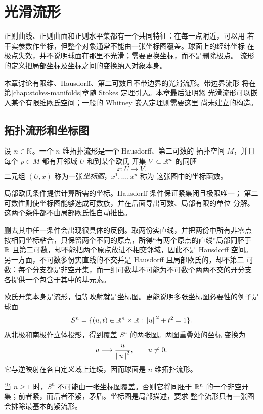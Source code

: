 \chapter{光滑流形}
\label{chap:smooth-manifolds}

正则曲线、正则曲面和正则水平集都有一个共同特征：在每一点附近，可以用
若干实参数作坐标，但整个对象通常不能由一张坐标图覆盖。球面上的经纬坐标
在极点失效，并不说明球面在那里不光滑；需要更换坐标，而不是删除极点。
流形的定义把局部坐标及坐标之间的变换纳入对象本身。

本章讨论有限维、Hausdorff、第二可数且不带边界的光滑流形。带边界流形
将在第\ref{chap:stokes-manifolds}章随 Stokes 定理引入。本章最后证明紧
光滑流形可以嵌入某个有限维欧氏空间；一般的 Whitney 嵌入定理则需要这里
尚未建立的构造。

\section{拓扑流形和坐标图}

\begin{definition}
设 \(n\in\mathbb{N}\)。一个 \(n\) 维拓扑流形是一个 Hausdorff、第二可数的
拓扑空间 \(M\)，并且每个 \(p\in M\) 都有开邻域 \(U\) 和到某个欧氏
开集 \(V\subset\mathbb{R}^n\) 的同胚
\[
 x:U\longrightarrow V.
\]
二元组 \((U,x)\) 称为一张\emph{坐标图}，\(x^1,\ldots,x^n\) 称为
这张图中的坐标函数。
\end{definition}

局部欧氏条件提供计算所需的坐标。Hausdorff 条件保证紧集闭且极限唯一；
第二可数性则使坐标图能够选成可数族，并在后面导出可数、局部有限的单位
分解。这两个条件都不由局部欧氏性自动推出。

删去其中任一条件会出现很具体的反例。取两份实直线，并把两份中所有非零点
按相同坐标粘合，只保留两个不同的原点，所得“有两个原点的直线”局部同胚于
$\mathbb{R}$ 且第二可数，却不能把两个原点放进不相交邻域，因此不是 Hausdorff 空间。
另一方面，不可数多份实直线的不交并是 Hausdorff 且局部欧氏的，却不第二
可数：每个分支都是非空开集，而一组可数基不可能为不可数个两两不交的开分支
各提供一个包含于其中的基元素。

欧氏开集本身是流形，恒等映射就是坐标图。更能说明多张坐标图必要性的例子是
球面
\[
 S^n=\{(u,t)\in\mathbb{R}^n\times\mathbb{R}:\left\lVert u\right\rVert^2+t^2=1\}.
\]
从北极和南极作立体投影，得到覆盖 \(S^n\) 的两张图。两图重叠处的坐标
变换为
\[
 u\longmapsto \frac{u}{\left\lVert u\right\rVert^2},\qquad u\ne0.
\]
它与逆映射在各自定义域上连续，因而球面是 \(n\) 维拓扑流形。

当 \(n\ge1\) 时，\(S^n\) 不可能由一张坐标图覆盖。否则它将同胚于
\(\mathbb{R}^n\) 的一个非空开集；前者紧，而后者不紧，矛盾。坐标图是局部描述，要求
整个流形只有一张图会排除最基本的紧流形。


